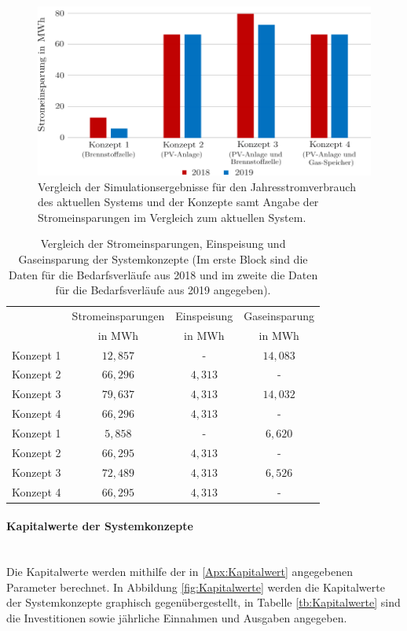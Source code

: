 \begin{figure}[h]
	\centering
		\includegraphics[scale=1]{Figures/Stromverbrauch_Sim_2}
		\caption{Vergleich der Simulationsergebnisse für den Jahresstromverbrauch des aktuellen Systems und der Konzepte samt Angabe der Stromeinsparungen im Vergleich zum aktuellen System.}
\label{fig:Strom}	
\end{figure}

\begin{table}[htb]
		\centering
		\caption{Vergleich der Stromeinsparungen, Einspeisung und Gaseinsparung der Systemkonzepte (Im erste Block sind die Daten für die Bedarfsverläufe aus 2018 und im zweite die Daten für die Bedarfsverläufe aus 2019 angegeben).}
		\begin{tabular}{l c c c}
		\toprule 
		& Stromeinsparungen & Einspeisung & Gaseinsparung
		\\
	    & in MWh & in MWh & in MWh\\
		\midrule
		Konzept 1 & $12,857$ &    -    & $14,083$\\
		Konzept 2 & $66,296$ & $4,313$ &    -    \\
		Konzept 3 & $79,637$ & $4,313$ & $14,032$\\
		Konzept 4 & $66,296$ & $4,313$ &    -    \\
		\midrule
		Konzept 1 & $5,858$  &    -    & $6,620$\\
		Konzept 2 & $66,295$ & $4,313$ &    -   \\
		Konzept 3 & $72,489$ & $4,313$ & $6,526$\\
		Konzept 4 & $66,295$ & $4,313$ &    -   \\
		\bottomrule
		\end{tabular}
		\label{tb:ErgebnisseSim}
\end{table}	
\FloatBarrier

\paragraph{Kapitalwerte der Systemkonzepte}\ \\
Die Kapitalwerte werden mithilfe der in \ref{Apx:Kapitalwert} angegebenen Parameter berechnet. In Abbildung \ref{fig:Kapitalwerte} werden die Kapitalwerte der Systemkonzepte graphisch gegenübergestellt, in Tabelle \ref{tb:Kapitalwerte} sind die Investitionen sowie jährliche Einnahmen und Ausgaben angegeben.\\

